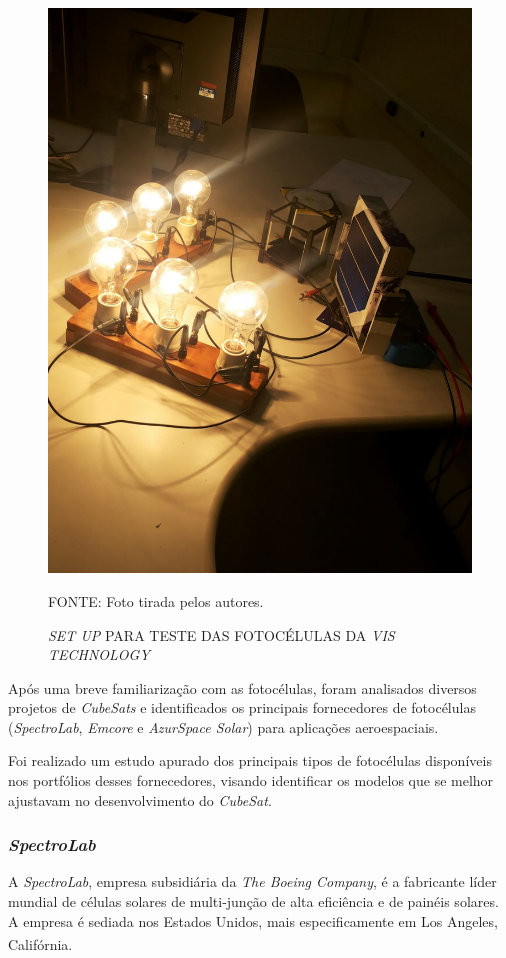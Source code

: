 \documentclass[
	12pt,				%
	openright,			%
	oneside,			%
	a4paper,			%
	english,			%
	french,				%
	spanish,			%
	brazil,				%
	oldfontcommands
	]{abntex2}
\begin{document}
	\begin{figure}[th]
		\caption{\textit{SET UP} PARA TESTE DAS FOTOCÉLULAS DA \textit{VIS TECHNOLOGY}}
		\label{Fig_Cell_Setup}
		\centering
		\includegraphics[width=0.7\linewidth]{./figs/setup}
			
		\begin{small}
			FONTE: Foto tirada pelos autores.
		\end{small}		
	\end{figure}
	\pagebreak
	Após uma breve familiarização com as fotocélulas, foram analisados diversos projetos de \textit{CubeSats} e identificados os principais fornecedores de fotocélulas (\textit{SpectroLab}, \textit{Emcore} e \textit{AzurSpace Solar}) para aplicações aeroespaciais.
	
	Foi realizado um estudo apurado dos principais tipos de fotocélulas disponíveis nos portfólios desses fornecedores, visando identificar os modelos que se melhor ajustavam no desenvolvimento do \textit{CubeSat}.
	
\subsubsection[SpectroLab]{\textit{SpectroLab}}
	
	A \textit{SpectroLab}, empresa subsidiária da \textit{The Boeing Company}, é a fabricante líder mundial de células solares de multi-junção de alta eficiência e de painéis solares. A empresa é sediada nos Estados Unidos, mais especificamente em Los Angeles, Califórnia.\textsuperscript{\cite{SpectroLab}}
	
\end{document}
